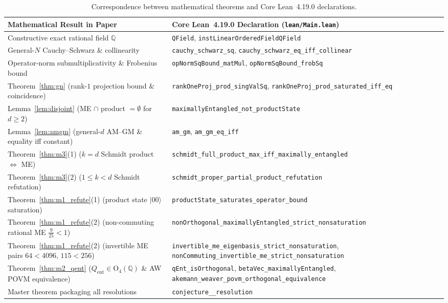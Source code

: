 \documentclass[11pt,a4paper]{article}
\newcommand{\ust}{\_\allowbreak}
\theoremstyle{plain}
\theoremstyle{definition}
\newcommand{\Q}{\mathbb{Q}}
\newcommand{\Orth}{\mathrm{O}}
\begin{document}
\begin{table}[ht!]
\centering
\small
\renewcommand{\arraystretch}{1.22}
\begin{tabular}{@{}>{\raggedright\arraybackslash}p{6.0cm}>{\raggedright\arraybackslash}p{8.7cm}@{}}
\hline
\textbf{Mathematical Result in Paper} & \textbf{Core Lean~4.19.0 Declaration (\texttt{lean/Main.lean})} \\
\hline
Constructive exact rational field $\Q$ & \texttt{QField}, \texttt{instLinearOrderedFieldQField} \\
General-$N$ Cauchy--Schwarz \& collinearity & \texttt{cauchy\ust schwarz\ust sq}, \texttt{cauchy\ust schwarz\ust eq\ust iff\ust collinear} \\
Operator-norm submultiplicativity \& Frobenius bound & \texttt{opNormSqBound\ust matMul}, \texttt{opNormSqBound\ust frobSq} \\
Theorem~\ref{thm:gn} (rank-$1$ projection bound \& coincidence) & \texttt{rankOneProj\ust prod\ust singValSq}, \texttt{rankOneProj\ust prod\ust saturated\ust iff\ust eq} \\
Lemma~\ref{lem:disjoint} (ME $\cap$ product $= \emptyset$ for $d \ge 2$) & \texttt{maximallyEntangled\ust not\ust productState} \\
Lemma~\ref{lem:amgm} (general-$d$ AM--GM \& equality iff constant) & \texttt{am\ust gm}, \texttt{am\ust gm\ust eq\ust iff} \\
Theorem~\ref{thm:m3}(1) ($k=d$ Schmidt product $\iff$ ME) & \texttt{schmidt\ust full\ust product\ust max\ust iff\ust maximally\ust entangled} \\
Theorem~\ref{thm:m3}(2) ($1 \le k < d$ Schmidt refutation) & \texttt{schmidt\ust proper\ust partial\ust product\ust refutation} \\
Theorem~\ref{thm:m1_refute}(1) (product state $|00\rangle$ saturation) & \texttt{productState\ust saturates\ust operator\ust bound} \\
Theorem~\ref{thm:m1_refute}(2) (non-commuting rational ME $\frac{9}{25} < 1$) & \texttt{nonOrthogonal\ust maximallyEntangled\ust strict\ust nonsaturation} \\
Theorem~\ref{thm:m1_refute}(2) (invertible ME pairs $64 < 4096$, $115 < 256$) & \texttt{invertible\ust me\ust eigenbasis\ust strict\ust nonsaturation}, \texttt{nonCommuting\ust invertible\ust me\ust strict\ust nonsaturation} \\
Theorem~\ref{thm:m2_qent} ($Q_{\mathrm{ent}} \in \Orth_4(\Q)$ \& AW POVM equivalence) & \texttt{qEnt\ust isOrthogonal}, \texttt{betaVec\ust maximallyEntangled}, \texttt{akemann\ust weaver\ust povm\ust orthogonal\ust equivalence} \\
Master theorem packaging all resolutions & \texttt{conjecture\ust 00000007172\ust resolution} \\
\hline
\end{tabular}
\caption{Correspondence between mathematical theorems and Core Lean~4.19.0 declarations.}
\label{tab:lean}
\end{table}
\end{document}
